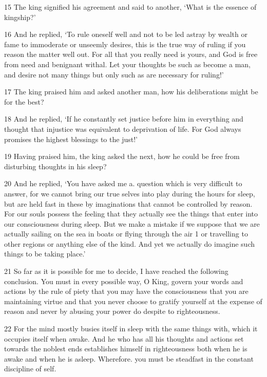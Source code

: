 \par 15 The king signified his agreement and said to another, ‘What is the essence of kingship?’

\par 16 And he replied, ‘To rule oneself well and not to be led astray by wealth or fame to immoderate or unseemly desires, this is the true way of ruling if you reason the matter well out. For all that you really need is yours, and God is free from need and benignant withal. Let your thoughts be such as become a man, and desire not many things but only such as are necessary for ruling!’

\par 17 The king praised him and asked another man, how his deliberations might be for the best?

\par 18 And he replied, ‘If he constantly set justice before him in everything and thought that injustice was equivalent to deprivation of life. For God always promises the highest blessings to the just!’

\par 19 Having praised him, the king asked the next, how he could be free from disturbing thoughts in his sleep?

\par 20 And he replied, ‘You have asked me a. question which is very difficult to answer, for we cannot bring our true selves into play during the hours for sleep, but are held fast in these by imaginations that cannot be controlled by reason. For our souls possess the feeling that they actually see the things that enter into our consciousness during sleep. But we make a mistake if we suppose that we are actually sailing on the sea in boats or flying through the air 1 or travelling to other regions or anything else of the kind. And yet we actually do imagine such things to be taking place.’

\par 21 So far as it is possible for me to decide, I have reached the following conclusion. You must in every possible way, O King, govern your words and actions by the rule of piety that you may have the consciousness that you are maintaining virtue and that you never choose to gratify yourself at the expense of reason and never by abusing your power do despite to righteousness.

\par 22 For the mind mostly busies itself in sleep with the same things with, which it occupies itself when awake. And he who has all his thoughts and actions set towards the noblest ends establishes himself in righteousness both when he is awake and when he is asleep. Wherefore. you must be steadfast in the constant discipline of self.

